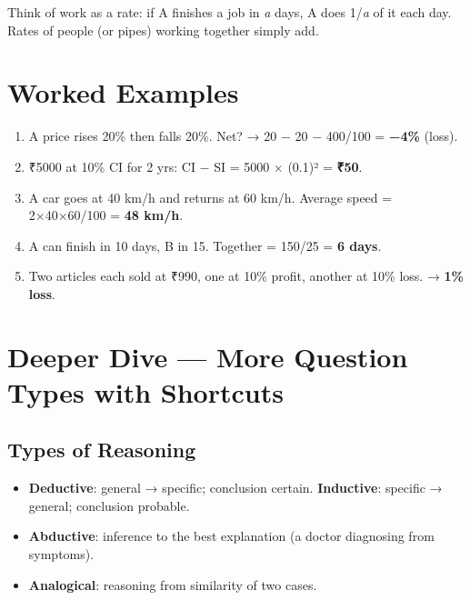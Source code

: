 Think of work as a rate: if A finishes a job in \emph{a} days, A does 1/\emph{a} of it each day. Rates of people (or
pipes) working together simply add.



\needspace{95pt}

\hypertarget{p1-05--worked-examples}{%
\section{Worked Examples}\label{p1-05--worked-examples}}

\begin{enumerate}
\def\labelenumi{\arabic{enumi}.}
\tightlist
\item
  A price rises 20\% then falls 20\%. Net? → 20 − 20 − 400/100 = \textbf{−4\%} (loss).
\item
  ₹5000 at 10\% CI for 2 yrs: CI − SI = 5000 × (0.1)² = \textbf{₹50}.
\item
  A car goes at 40 km/h and returns at 60 km/h. Average speed = 2×40×60/100 = \textbf{48 km/h}.
\item
  A can finish in 10 days, B in 15. Together = 150/25 = \textbf{6 days}.
\item
  Two articles each sold at ₹990, one at 10\% profit, another at 10\% loss. → \textbf{1\% loss}.
\end{enumerate}

\needspace{131pt}

\hypertarget{p1-05--6-deeper-dive--more-question-types-with-shortcuts}{%
\section{Deeper Dive --- More Question Types with Shortcuts}\label{p1-05--6-deeper-dive--more-question-types-with-shortcuts}}

\needspace{95pt}

\hypertarget{p1-05--61-types-of-reasoning}{%
\subsection{Types of Reasoning}\label{p1-05--61-types-of-reasoning}}

\begin{itemize}
\tightlist
\item
  \textbf{Deductive}: general → specific; conclusion certain. \textbf{Inductive}: specific → general; conclusion probable.
\item
  \textbf{Abductive}: inference to the best explanation (a doctor diagnosing from symptoms).
\item
  \textbf{Analogical}: reasoning from similarity of two cases.
\end{itemize}

